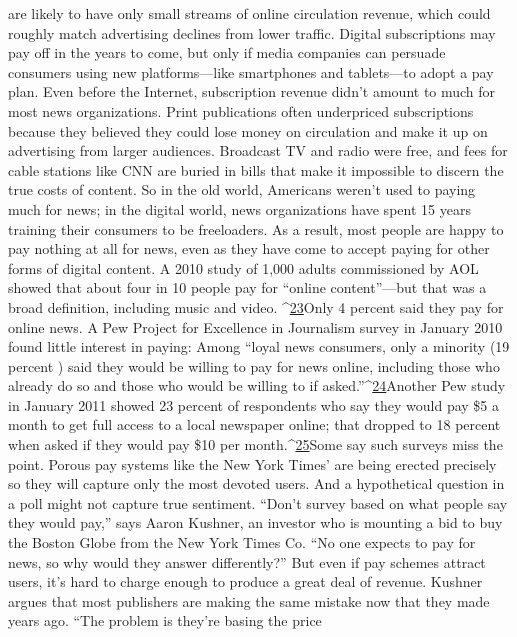 are likely to have only small streams of online circulation revenue, which
could roughly match advertising declines from lower traffic. Digital subscriptions
may pay off in the years to come, but only if media companies can persuade consumers
using new platforms—like smartphones and tablets—to adopt a pay plan.
Even before the Internet, subscription revenue didn't amount to much for
most news organizations. Print publications often underpriced subscriptions because
they believed they could lose money on circulation and make it up on
advertising from larger audiences. Broadcast TV and radio were free, and fees
for cable stations like CNN are buried in bills that make it impossible to discern
the true costs of content. So in the old world, Americans weren't used to paying
much for news; in the digital world, news organizations have spent 15 years training
their consumers to be freeloaders.
As a result, most people are happy to pay nothing at all for news, even as they
have come to accept paying for other forms of digital content. A 2010 study of
1,000 adults commissioned by AOL showed that about four in 10 people pay for
``online content''—but that was a broad definition, including music and video. ^{\href{#endnotes-chapter-5}{23}}Only 4 percent said they pay for online news. A Pew Project for Excellence in
Journalism survey in January 2010 found little interest in paying: Among ``loyal
news consumers, only a minority (19 percent ) said they would be willing to
pay for news online, including those who already do so and those who would
be willing to if asked.''^{\href{#endnotes-chapter-5}{24}}Another Pew study in January 2011 showed 23 percent
of respondents who say they would pay \$5 a month to get full access to a local
newspaper online; that dropped to 18 percent when asked if they would pay \$10
per month.^{\href{#endnotes-chapter-5}{25}}Some say such surveys miss the point. Porous pay systems like the New York
Times' are being erected precisely so they will capture only the most devoted users.
And a hypothetical question in a poll might not capture true sentiment. ``Don't
survey based on what people say they would pay,'' says Aaron Kushner, an investor
who is mounting a bid to buy the Boston Globe from the New York Times Co.
``No one expects to pay for news, so why would they answer differently?''
But even if pay schemes attract users, it's hard to charge enough to produce a
great deal of revenue. Kushner argues that most publishers are making the same
mistake now that they made years ago. ``The problem is they're basing the price

